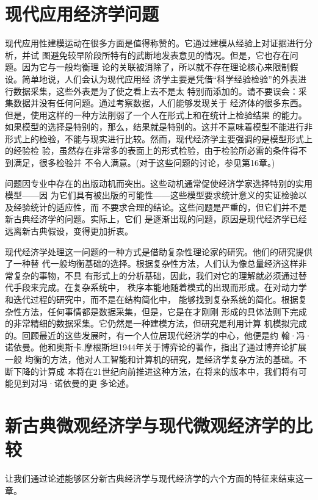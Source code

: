 \section{现代应用经济学问题}

现代应用性建模运动在很多方面是值得称赞的。它通过建模从经验上对证据进行分析，并试
图避免较早阶段所特有的武断地发表意见的情况。但是，它也存在问题。因为它与一般均衡理
论的关联被消除了，所以就不存在理论核心来限制假设。简单地说，人们会认为现代应用经
济学主要是凭借“科学经验检验”的外表进行数据采集，这些外表是为了使之看上去不是太
特别而添加的。请不要误会：采集数据并没有任何问题。通过考察数据，人们能够发现关于
经济体的很多东西。但是，使用这样的一种方法削弱了一个人在形式上和在统计上检验结果
的能力。如果模型的选择是特别的，那么，结果就是特别的。这并不意味着模型不能进行非
形式上的检验，不能与现实进行比较。然而，现代经济学主要强调的是模型形式上的经验检
验，虽然存在非常多的表面上的形式检验，由于检验所必需的条件得不到满足，很多检验并
不令人满意。(对于这些问题的讨论，参见第16章。)

问题因专业中存在的出版动机而突出。这些动机通常促使经济学家选择特别的实用模型——因
为它们具有被出版的可能性——这些模型要求统计意义的实证检验以及经验统计的适应性，而
不要求合理的结论。这些问题是严重的，但它们并不是新古典经济学的问题。实际上，它们
是逐渐出现的问题，原因是现代经济学已经远离新古典假设，变得更加折衷。

现代经济学处理这一问题的一种方式是借助复杂性理论家的研究。他们的研究提供了一种替
代一般均衡基础的选择。根据复杂性方法，人们认为像总量经济这样非常复杂的事物，不具
有形式上的分析基础，因此，我们对它的理解就必须通过替代手段来完成。在复杂系统中，
秩序本能地随着模式的出现而形成。在对动力学和迭代过程的研究中，而不是在结构简化中，
能够找到复杂系统的简化。根据复杂性方法，任何事情都是数据采集，但是，它是在才刚刚
形成的具体法则下完成的非常精细的数据采集。它仍然是一种建模方法，但研究是利用计算
机模拟完成的。回顾最近的这些发展时，有一个人位居现代经济学的中心，他便是约
翰·冯·诺依曼。他和奥斯卡.摩根斯坦1944年关于博弈论的著作，指出了通过博弃论扩展一般
均衡的方法，他对人工智能和计算机的研究，是经济学复杂方法的基础。不断下降的计算成
本将在21世纪向前推进这种方法，在将来的版本中，我们将有可能见到对冯·诺依曼的更
多论述。



\section{新古典微观经济学与现代微观经济学的比较}

让我们通过论述能够区分新古典经济学与现代经济学的六个方面的特征来结束这一章。

